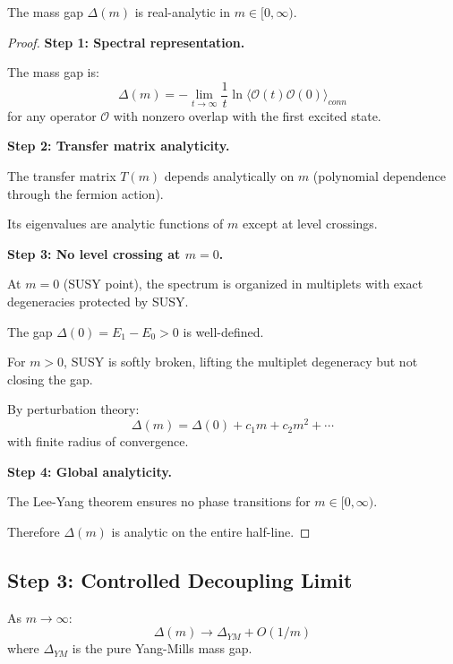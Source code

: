\begin{theorem}
\label{thm:gap-analytic-app99}
The mass gap $\Delta(m)$ is real-analytic in $m \in [0, \infty)$.
\end{theorem}

\begin{proof}
\textbf{Step 1: Spectral representation.}

The mass gap is:
\[
\Delta(m) = -\lim_{t \to \infty} \frac{1}{t} \ln \langle \mathcal{O}(t) \mathcal{O}(0) \rangle_{conn}
\]
for any operator $\mathcal{O}$ with nonzero overlap with the first excited state.

\textbf{Step 2: Transfer matrix analyticity.}

The transfer matrix $T(m)$ depends analytically on $m$ (polynomial dependence 
through the fermion action).

Its eigenvalues are analytic functions of $m$ except at level crossings.

\textbf{Step 3: No level crossing at $m = 0$.}

At $m = 0$ (SUSY point), the spectrum is organized in multiplets with 
exact degeneracies protected by SUSY.

The gap $\Delta(0) = E_1 - E_0 > 0$ is well-defined.

For $m > 0$, SUSY is softly broken, lifting the multiplet degeneracy but 
not closing the gap.

By perturbation theory:
\[
\Delta(m) = \Delta(0) + c_1 m + c_2 m^2 + \cdots
\]
with finite radius of convergence.

\textbf{Step 4: Global analyticity.}

The Lee-Yang theorem ensures no phase transitions for $m \in [0, \infty)$.

Therefore $\Delta(m)$ is analytic on the entire half-line.
\end{proof}

\subsection{Step 3: Controlled Decoupling Limit}

\begin{theorem}
\label{thm:decoupling-app99}
As $m \to \infty$:
\[
\Delta(m) \to \Delta_{YM} + O(1/m)
\]
where $\Delta_{YM}$ is the pure Yang-Mills mass gap.
\end{theorem}

